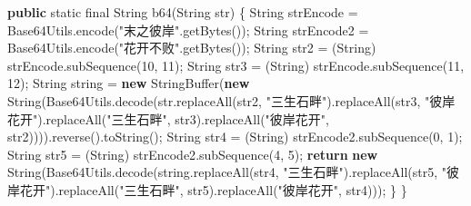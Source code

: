 \documentclass[
]{article}
\newenvironment{Shaded}{}{}
\newcommand{\BuiltInTok}[1]{\textcolor[rgb]{0.00,0.50,0.00}{#1}}
\newcommand{\ControlFlowTok}[1]{\textcolor[rgb]{0.00,0.44,0.13}{\textbf{#1}}}
\newcommand{\DataTypeTok}[1]{\textcolor[rgb]{0.56,0.13,0.00}{#1}}
\newcommand{\DecValTok}[1]{\textcolor[rgb]{0.25,0.63,0.44}{#1}}
\newcommand{\FunctionTok}[1]{\textcolor[rgb]{0.02,0.16,0.49}{#1}}
\newcommand{\KeywordTok}[1]{\textcolor[rgb]{0.00,0.44,0.13}{\textbf{#1}}}
\newcommand{\NormalTok}[1]{#1}
\newcommand{\OperatorTok}[1]{\textcolor[rgb]{0.40,0.40,0.40}{#1}}
\newcommand{\StringTok}[1]{\textcolor[rgb]{0.25,0.44,0.63}{#1}}
\begin{document}
\begin{Shaded}
\begin{Highlighting}[]
    \KeywordTok{public} \DataTypeTok{static} \DataTypeTok{final} \BuiltInTok{String} \FunctionTok{b64}\OperatorTok{(}\BuiltInTok{String}\NormalTok{ str}\OperatorTok{)} \OperatorTok{\{}
        \BuiltInTok{String}\NormalTok{ strEncode }\OperatorTok{=}\NormalTok{ Base64Utils}\OperatorTok{.}\FunctionTok{encode}\OperatorTok{(}\StringTok{"末之彼岸"}\OperatorTok{.}\FunctionTok{getBytes}\OperatorTok{());}
        \BuiltInTok{String}\NormalTok{ strEncode2 }\OperatorTok{=}\NormalTok{ Base64Utils}\OperatorTok{.}\FunctionTok{encode}\OperatorTok{(}\StringTok{"花开不败"}\OperatorTok{.}\FunctionTok{getBytes}\OperatorTok{());}
        \BuiltInTok{String}\NormalTok{ str2 }\OperatorTok{=} \OperatorTok{(}\BuiltInTok{String}\OperatorTok{)}\NormalTok{ strEncode}\OperatorTok{.}\FunctionTok{subSequence}\OperatorTok{(}\DecValTok{10}\OperatorTok{,} \DecValTok{11}\OperatorTok{);}
        \BuiltInTok{String}\NormalTok{ str3 }\OperatorTok{=} \OperatorTok{(}\BuiltInTok{String}\OperatorTok{)}\NormalTok{ strEncode}\OperatorTok{.}\FunctionTok{subSequence}\OperatorTok{(}\DecValTok{11}\OperatorTok{,} \DecValTok{12}\OperatorTok{);}
        \BuiltInTok{String}\NormalTok{ string }\OperatorTok{=} \KeywordTok{new} \BuiltInTok{StringBuffer}\OperatorTok{(}\KeywordTok{new} \BuiltInTok{String}\OperatorTok{(}\NormalTok{Base64Utils}\OperatorTok{.}\FunctionTok{decode}\OperatorTok{(}\NormalTok{str}\OperatorTok{.}\FunctionTok{replaceAll}\OperatorTok{(}\NormalTok{str2}\OperatorTok{,} \StringTok{"三生石畔"}\OperatorTok{).}\FunctionTok{replaceAll}\OperatorTok{(}\NormalTok{str3}\OperatorTok{,} \StringTok{"彼岸花开"}\OperatorTok{).}\FunctionTok{replaceAll}\OperatorTok{(}\StringTok{"三生石畔"}\OperatorTok{,}\NormalTok{ str3}\OperatorTok{).}\FunctionTok{replaceAll}\OperatorTok{(}\StringTok{"彼岸花开"}\OperatorTok{,}\NormalTok{ str2}\OperatorTok{)))).}\FunctionTok{reverse}\OperatorTok{().}\FunctionTok{toString}\OperatorTok{();}
        \BuiltInTok{String}\NormalTok{ str4 }\OperatorTok{=} \OperatorTok{(}\BuiltInTok{String}\OperatorTok{)}\NormalTok{ strEncode2}\OperatorTok{.}\FunctionTok{subSequence}\OperatorTok{(}\DecValTok{0}\OperatorTok{,} \DecValTok{1}\OperatorTok{);}
        \BuiltInTok{String}\NormalTok{ str5 }\OperatorTok{=} \OperatorTok{(}\BuiltInTok{String}\OperatorTok{)}\NormalTok{ strEncode2}\OperatorTok{.}\FunctionTok{subSequence}\OperatorTok{(}\DecValTok{4}\OperatorTok{,} \DecValTok{5}\OperatorTok{);}
        \ControlFlowTok{return} \KeywordTok{new} \BuiltInTok{String}\OperatorTok{(}\NormalTok{Base64Utils}\OperatorTok{.}\FunctionTok{decode}\OperatorTok{(}\NormalTok{string}\OperatorTok{.}\FunctionTok{replaceAll}\OperatorTok{(}\NormalTok{str4}\OperatorTok{,} \StringTok{"三生石畔"}\OperatorTok{).}\FunctionTok{replaceAll}\OperatorTok{(}\NormalTok{str5}\OperatorTok{,} \StringTok{"彼岸花开"}\OperatorTok{).}\FunctionTok{replaceAll}\OperatorTok{(}\StringTok{"三生石畔"}\OperatorTok{,}\NormalTok{ str5}\OperatorTok{).}\FunctionTok{replaceAll}\OperatorTok{(}\StringTok{"彼岸花开"}\OperatorTok{,}\NormalTok{ str4}\OperatorTok{)));}
    \OperatorTok{\}}
\OperatorTok{\}}
\end{Highlighting}
\end{Shaded}
\end{document}

